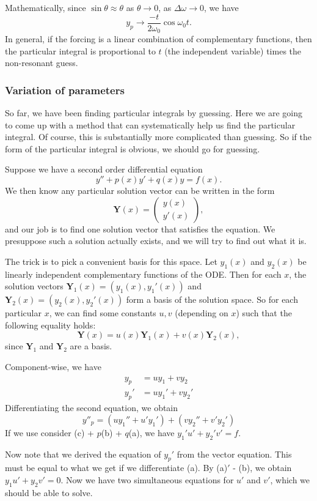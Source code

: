 \documentclass[a4paper]{article}
\begin{document}
Mathematically, since $\sin\theta \approx \theta$ as $\theta \to 0$, as $\Delta\omega \to 0$, we have
\[
  y_p\to \frac{-t}{2\omega_0}\cos\omega_0 t.
\]
In general, if the forcing is a linear combination of complementary functions, then the particular integral is proportional to $t$ (the independent variable) times the non-resonant guess.

\subsubsection{Variation of parameters}
So far, we have been finding particular integrals by guessing. Here we are going to come up with a method that can systematically help us find the particular integral. Of course, this is substantially more complicated than guessing. So if the form of the particular integral is obvious, we should go for guessing.

Suppose we have a second order differential equation
\[
  y'' + p(x)y' + q(x)y = f(x).
\]
We then know any particular solution vector can be written in the form
\[
  \mathbf{Y}(x) =
  \begin{pmatrix}
    y(x)\\
    y'(x)
  \end{pmatrix},
\]
and our job is to find one solution vector that satisfies the equation. We presuppose such a solution actually exists, and we will try to find out what it is.

The trick is to pick a convenient basis for this space. Let $y_1(x)$ and $y_2(x)$ be linearly independent complementary functions of the ODE. Then for each $x$, the solution vectors $\mathbf{Y}_1(x) = (y_1(x), y_1'(x))$ and $\mathbf{Y}_2(x) = (y_2(x), y_2'(x))$ form a basis of the solution space. So for each particular $x$, we can find some constants $u, v$ (depending on $x$) such that the following equality holds:
\[
  \mathbf{Y}(x) = u(x) \mathbf{Y}_1(x) + v(x) \mathbf{Y}_2(x),
\]
since $\mathbf{Y}_1$ and $\mathbf{Y}_2$ are a basis.

Component-wise, we have
\begin{align*}
  y_p &= uy_1 + vy_2 \tag{a}\\
  y_p' &= uy_1' + vy_2' \tag{b}
\end{align*}
Differentiating the second equation, we obtain
\[
  y''_p = (uy_1'' + u'y_1') + (vy_2'' + v'y_2') \tag{c}
\]
If we use consider (c) + $p$(b) + $q$(a), we have $y_1' u' + y_2'v' = f$.

Now note that we derived the equation of $y_p'$ from the vector equation. This must be equal to what we get if we differentiate (a). By (a)$'$ - (b), we obtain $y_1u' + y_2v' = 0$. Now we have two simultaneous equations for $u'$ and $v'$, which we should be able to solve.
\end{document}
